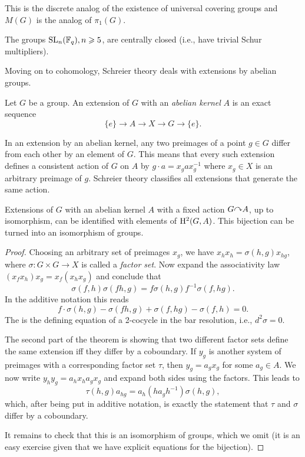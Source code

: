 This is the discrete analog of the existence of universal covering groups and $M(G)$ is the analog of $\pi_1(G)$.

\begin{thm}[Schur]
    The groups $\operatorname{SL}_n(\mathbb{F}_q),n\geqslant 5$, are centrally closed (i.e., have trivial Schur multipliers).
\end{thm}

Moving on to cohomology, Schreier theory deals with extensions by abelian groups.

\begin{defn}
    Let $G$ be a group. An extension of $G$ with an \emph{abelian kernel} $A$ is an exact sequence
    \[\{e\}\to A\to X\to G\to \{e\}.\]
\end{defn}

In an extension by an abelian kernel, any two preimages of a point $g\in G$ differ from each other by an element of $G$. This means that every such extension defines a consistent action of $G$ on $A$ by $g\cdot a=x_g ax_g^{-1}$ where $x_g\in X$ is an arbitrary preimage of $g$. Schreier theory classifies all extensions that generate the same action.

\begin{thm}[Schreier]
    Extensions of $G$ with an abelian kernel $A$ with a fixed action $G\acts A$, up to isomorphism, can be identified with elements of $\mathrm{H}^2(G,A)$. This bijection can be turned into an isomorphism of groups.
\end{thm}
\begin{proof}
    Choosing an arbitrary set of preimages $x_g$, we have $x_hx_h=\sigma(h,g)x_{hg}$, where $\sigma:G\times G\to X$ is called a \emph{factor set}. Now expand the associativity law $(x_fx_h)x_g=x_f(x_hx_g)$ and conclude that 
    \[\sigma(f,h)\sigma(fh,g)=f\sigma(h,g)f^{-1}\sigma(f,hg).\]
    In the additive notation this reads
    \[f\cdot\sigma(h,g)-\sigma(fh,g)+\sigma(f,hg)-\sigma(f,h)=0.\]
    The is the defining equation of a 2-cocycle in the bar resolution, i.e., $d^2\sigma=0$.

    The second part of the theorem is showing that two different factor sets define the same extension iff they differ by a coboundary. If $y_g$ is another system of preimages with a corresponding factor set $\tau$, then $y_g=a_gx_g$ for some $a_g\in A$. We now write $y_hy_g=a_hx_ha_gx_g$ and expand both sides using the factors. This leads to
    \[\tau(h,g)a_{hg}=a_h (ha_gh^{-1})\sigma(h,g),\]
    which, after being put in additive notation, is exactly the statement that $\tau$ and $\sigma$ differ by a coboundary.

    It remains to check that this is an isomorphism of groups, which we omit (it is an easy exercise given that we have explicit equations for the bijection).
\end{proof}

